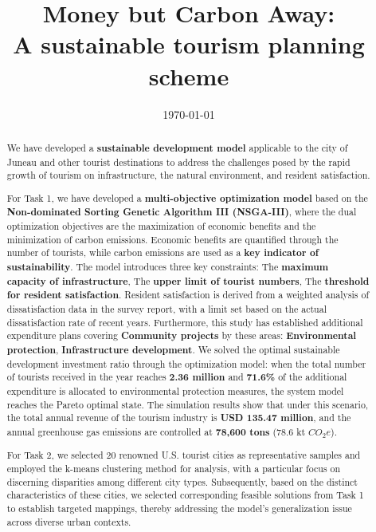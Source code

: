 \documentclass{mcmthesis}
\title{Money but Carbon Away:\\ A sustainable tourism planning scheme}
\date{\today}
\begin{document}
\begin{abstract}

  We have developed a \textbf{sustainable development model} applicable to the city of Juneau and 
other tourist destinations to address the challenges posed by the rapid growth of tourism
on infrastructure, the natural environment, and resident satisfaction.\par  
For Task 1, we have developed a \textbf{multi-objective optimization model} based on the 
\textbf{Non-dominated Sorting Genetic Algorithm III (NSGA-III)}, where the dual optimization 
objectives are the maximization of economic benefits and the minimization of carbon emissions. 
Economic benefits are quantified through the number of tourists, while carbon emissions 
are used as a \textbf{key indicator of sustainability}. The model introduces three key constraints:  
The \textbf{maximum capacity of infrastructure},
The \textbf{upper limit of tourist numbers},
The \textbf{threshold for resident satisfaction}.
Resident satisfaction is derived from a weighted analysis of dissatisfaction data in the 
survey report, with a 
limit set based on the actual 
dissatisfaction rate of recent years. 
Furthermore, this study has established additional 
expenditure plans covering \textbf{Community projects} by these areas:
\textbf{Environmental protection},
\textbf{Infrastructure development}. 
We solved the optimal sustainable development investment ratio through the optimization model: when the total number of tourists received in the year reaches \textbf{2.36 million} and \textbf{71.6\%} of the additional expenditure is allocated to environmental protection measures, the system model reaches the Pareto optimal state. The simulation results show that under this scenario, the total annual revenue of the tourism industry is \textbf{USD 135.47 million}, and the annual greenhouse gas emissions are controlled at \textbf{78,600 tons} (78.6 kt $CO_2e$).\par
For Task 2, we selected 20 renowned U.S. tourist cities as representative samples and employed the k-means clustering method for analysis, with a particular focus on discerning disparities among different city types. Subsequently, based on the distinct characteristics of these cities, we selected corresponding feasible solutions from Task 1 to establish targeted mappings, thereby addressing the model's generalization issue across diverse urban contexts.\par


\end{abstract}
\end{document}
